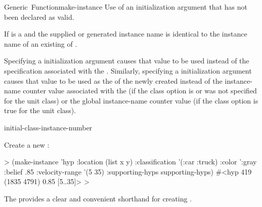 \documentclass[10pt,twoside,english,pdftex]{article}
\begin{document}
\begin{functiondoc}{Generic~Function}{make-instance}{
     
     
    \returns{} }
\fnerrors
Use of an initialization argument that has not been declared as valid.

If  is a  and the supplied or generated
instance name is identical to the instance name of an existing
 of .

%
%
%
%
%
\fndescription 
%
Specifying a  initialization argument
causes that value to be used instead of the 
specification associated with the . Similarly, specifying a
 initialization argument causes that value to be used as
the  of the newly created  instead
of the instance-name counter value associated with the  (if
the  class option is \nil{} or was not
specified for the unit class) or the global instance-name counter value (if
the  class option is true for the unit
class).

\begin{alsos}{initial-class-instance-number}
\end{alsos}

\fnexample
Create a new  :
%
\W\supp
\begin{example}
  > (make-instance 'hyp 
       :location (list x y)
       :classification '(:car :truck)
       :color ':gray
       :belief .85
       :velocity-range '(5 35)
       :supporting-hyps supporting-hyps)
  #<hyp 419 (1835 4791) 0.85 [5..35]>
  >
\end{example}

\fnnote 
{}%
The  \textbf{} provides a
clear and convenient shorthand for creating .

\end{functiondoc}

\end{document}
